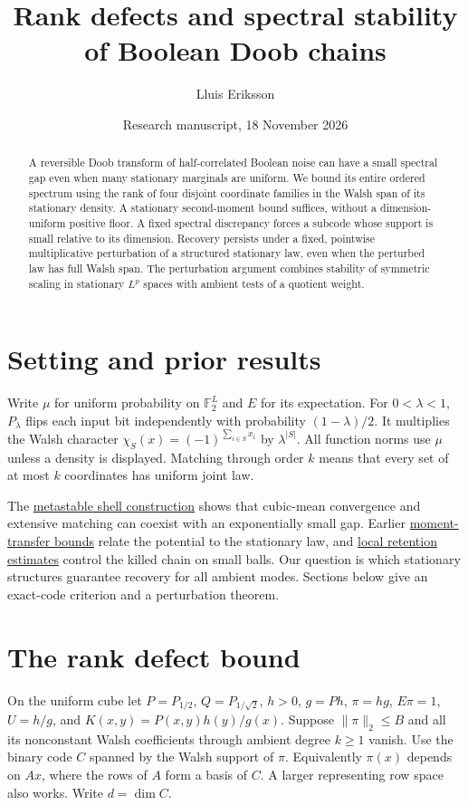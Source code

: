 \documentclass[11pt]{article}
\title{Rank defects and spectral stability of Boolean Doob chains}
\author{Lluis Eriksson}
\date{Research manuscript, 18 November 2026}
\begin{document}
\maketitle
\begin{abstract}
A reversible Doob transform of half-correlated Boolean noise can have a small spectral gap even when many stationary marginals are uniform. We bound its entire ordered spectrum using the rank of four disjoint coordinate families in the Walsh span of its stationary density. A stationary second-moment bound suffices, without a dimension-uniform positive floor. A fixed spectral discrepancy forces a subcode whose support is small relative to its dimension. Recovery persists under a fixed, pointwise multiplicative perturbation of a structured stationary law, even when the perturbed law has full Walsh span. The perturbation argument combines stability of symmetric scaling in stationary $L^p$ spaces with ambient tests of a quotient weight.
\end{abstract}
\section{Setting and prior results}
Write $\mu$ for uniform probability on $\mathbb F_2^L$ and $E$ for its expectation. For $0<\lambda<1$, $P_\lambda$ flips each input bit independently with probability $(1-\lambda)/2$. It multiplies the Walsh character $\chi_S(x)=(-1)^{\sum_{i\in S}x_i}$ by $\lambda^{|S|}$. All function norms use $\mu$ unless a density is displayed. Matching through order $k$ means that every set of at most $k$ coordinates has uniform joint law.

The \href{https://airr.science/papers/ARR-2026-2B2W1WQ7DF9N5VW7/versions/v1/}{metastable shell construction} shows that cubic-mean convergence and extensive matching can coexist with an exponentially small gap. Earlier \href{https://airr.science/papers/ARR-2026-4T35VQ6MZB8F99F4/versions/v3/}{moment-transfer bounds} relate the potential to the stationary law, and \href{https://airr.science/papers/ARR-2026-6E2HS34Q2Z8349BJ/versions/v1/}{local retention estimates} control the killed chain on small balls. Our question is which stationary structures guarantee recovery for all ambient modes. Sections below give an exact-code criterion and a perturbation theorem.

\section{The rank defect bound}\label{sec:exact}
On the uniform cube let \(P=P_{1/2}\), \(Q=P_{1/\sqrt2}\), \(h>0\), \(g=Ph\), \(\pi=hg\), \(E\pi=1\), \(U=h/g\), and \(K(x,y)=P(x,y)h(y)/g(x)\). Suppose \(\|\pi\|_2\le B\) and all its nonconstant Walsh coefficients through ambient degree \(k\ge1\) vanish. Use the binary code \(C\) spanned by the Walsh support of \(\pi\). Equivalently \(\pi(x)\) depends on \(Ax\), where the rows of \(A\) form a basis of \(C\). A larger representing row space also works. Write \(d=\dim C\).
\end{document}
